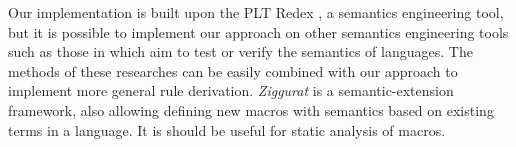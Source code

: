 Our implementation is built upon the PLT Redex \cite{SEwPR}, a semantics engineering tool, but it is possible to implement our approach on other semantics engineering tools such as those in \cite{dynsem,Ksemantic} which aim to test or verify the semantics of languages. The methods of these researches can be easily combined with our approach to implement more general rule derivation. \emph{Ziggurat} \cite{Ziggurat} is a semantic-extension framework, also allowing defining new macros with semantics based on existing terms in a language. It is should be useful for static analysis of macros.

